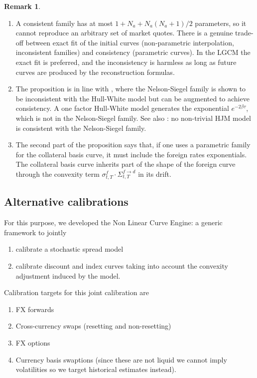 \documentclass[11pt,english]{amsart}
\theoremstyle{definition}
\newtheorem{rema}{Remark}
\begin{document}
\begin{rema}
\begin{enumerate}
\item A consistent family has at most $1+N_a+N_a(N_a+1)/2$ parameters, so it cannot reproduce an arbitrary set of market quotes. There is a genuine trade-off between exact fit of the initial curves (non-parametric interpolation, inconsistent families) and consistency (parametric curves). In the LGCM the exact fit is preferred, and the inconsistency is harmless as long as future curves are produced by the reconstruction formulas.
\item The proposition is in line with \cite{BjorkChristensen}, where the Nelson-Siegel family is shown to be inconsistent with the Hull-White model but can be augmented to achieve consistency. A one factor Hull-White model generates the exponential $e^{-2\beta\tau}$, which is not in the Nelson-Siegel family. See also \cite{Filipovic:NelsonSiegel}: no non-trivial HJM model is consistent with the Nelson-Siegel family.
\item The second part of the proposition says that, if one uses a parametric family for the collateral basis curve, it must include the foreign rates exponentials. The collateral basis curve inherits part of the shape of the foreign curve through the convexity term $\sigma^{f}_{t,T}\cdot\Sigma^{f\to d}_{t,T}$ in its drift.
\end{enumerate}
\end{rema}


\subsection{Alternative calibrations}
For this purpose, we developed the Non Linear Curve Engine: a generic framework to jointly 
\begin{enumerate}
\item calibrate a stochastic spread model 
\item calibrate discount and index curves taking into account the convexity adjustment induced by the model. 
\end{enumerate}

Calibration targets for this joint calibration are 
\begin{enumerate}
\item FX forwards
\item Cross-currency swaps (resetting and non-resetting)
\item FX options
\item Currency basis swaptions (since these are not liquid we cannot imply volatilities so we target historical estimates instead). 
\end{enumerate}
\end{document}
